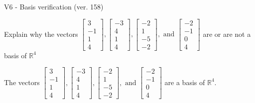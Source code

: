 \begin{exercise}
  \begin{exerciseTitle}V6 - Basis verification (ver. 158)\end{exerciseTitle}
  \begin{exerciseStatement}
    Explain why the vectors \(\left[\begin{array}{r}
3 \\
-1 \\
1 \\
4
\end{array}\right] , \left[\begin{array}{r}
-3 \\
4 \\
1 \\
4
\end{array}\right] , \left[\begin{array}{r}
-2 \\
1 \\
-5 \\
-2
\end{array}\right] , \text{ and } \left[\begin{array}{r}
-2 \\
-1 \\
0 \\
4
\end{array}\right]\) are or are not a basis of \(\mathbb{R}^4\)	


  \end{exerciseStatement}
  \begin{exerciseAnswer}
   The vectors \(\left[\begin{array}{r}
3 \\
-1 \\
1 \\
4
\end{array}\right] , \left[\begin{array}{r}
-3 \\
4 \\
1 \\
4
\end{array}\right] , \left[\begin{array}{r}
-2 \\
1 \\
-5 \\
-2
\end{array}\right] , \text{ and } \left[\begin{array}{r}
-2 \\
-1 \\
0 \\
4
\end{array}\right]\) 
  	 are  a basis of \(\mathbb{R}^4\).
  


  \end{exerciseAnswer}
\end{exercise}